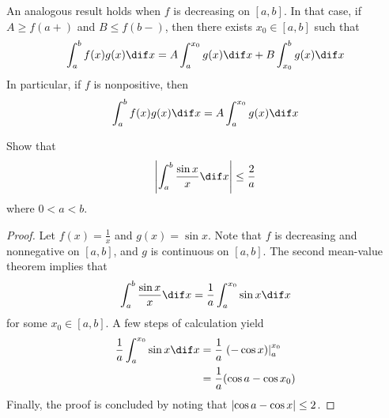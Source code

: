 \documentclass[thmcnt=section, color=blue, 12pt]{my-elegantbook}
\begin{document}
An analogous result holds when $f$ is decreasing on $[a, b]$.
In that case, if $A \geq f(a+)$ and $B \leq f(b-)$, then
there exists $x_0 \in [a, b]$ such that
\begin{align*}
	\int_a^b f(x) g(x) \dif x
	= A \int_a^{x_0} g(x) \dif x
	+ B \int_{x_0}^b g(x) \dif x
\end{align*}
In particular, if $f$ is nonpositive, then
\begin{align*}
	\int_a^b f(x) g(x) \dif x
	= A \int_a^{x_0} g(x) \dif x
\end{align*}

\begin{exercise}
	Show that
	\begin{align*}
		\abs{\int_a^b \frac{\sin x}{x} \dif x} \leq \frac{2}{a}
	\end{align*}
	where $0 < a < b$.
\end{exercise}

\begin{proof}
	Let $f(x) = \frac{1}{x}$ and $g(x) = \sin x$.
	Note that $f$ is decreasing and nonnegative on $[a, b]$,
	and $g$ is continuous on $[a, b]$.
	The second mean-value theorem implies that
	\begin{align*}
		\int_a^b \frac{\sin x}{x} \dif x
		= \frac{1}{a} \int_a^{x_0} \sin x \dif x
	\end{align*}
	for some $x_0 \in [a, b]$.
	A few steps of calculation yield
	\begin{align*}
		\frac{1}{a} \int_a^{x_0} \sin x \dif x
		 & = \frac{1}{a} \left . (-\cos x) \right\rvert_{a}^{x_0} \\
		 & = \frac{1}{a} (\cos a - \cos x_0)
	\end{align*}
	Finally, the proof is concluded by noting that $\left\lvert \cos a - \cos x \right\rvert \leq 2$.
\end{proof}




\printbibliography[heading=bibintoc, title=References]


\printindex
\end{document}
